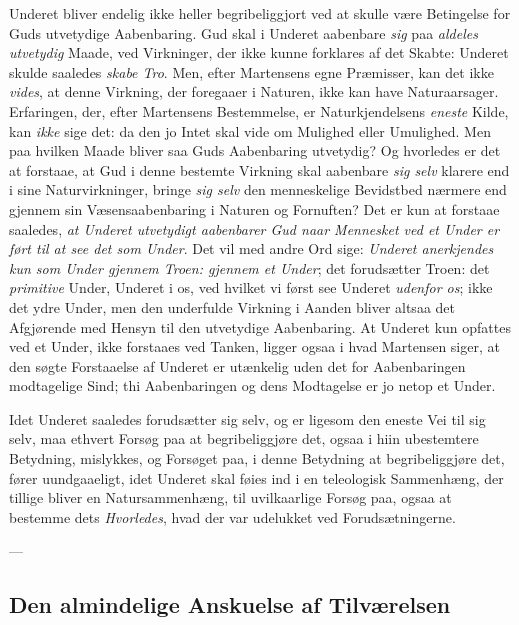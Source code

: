 \documentclass[12pt,a4paper]{book}
\newcommand{\opage}[1]{\marginnote{\footnotesize\textit{[#1]}}}
\begin{document}
Underet bliver endelig ikke heller begribeliggjort ved at skulle være Betingelse for Guds
utvetydige Aabenbaring. Gud skal i Underet aabenbare \emph{sig} paa \emph{aldeles utvetydig} Maade, ved
Virkninger, der ikke kunne forklares af det \opage{88}Skabte: Underet skulde saaledes \emph{skabe
Tro}. Men, efter Martensens egne Præmisser, kan det ikke \emph{vides}, at denne Virkning, der
foregaaer i Naturen, ikke kan have Naturaarsager. Erfaringen, der, efter Martensens
Bestemmelse, er Naturkjendelsens \emph{eneste} Kilde, kan \emph{ikke} sige det: da den jo Intet
skal vide om Mulighed eller Umulighed. Men paa hvilken Maade bliver saa Guds Aabenbaring
utvetydig? Og hvorledes er det at forstaae, at Gud i denne bestemte Virkning skal
aabenbare \emph{sig selv} klarere end i sine Naturvirkninger, bringe \emph{sig selv} den menneskelige Bevidstbed nærmere end gjennem sin Væsensaabenbaring i Naturen og Fornuften? Det er kun
at forstaae saaledes, \emph{at Underet utvetydigt aabenbarer Gud naar Mennesket ved et
Under er ført til at see det som Under}. Det vil med andre Ord sige: \emph{Underet anerkjendes kun som Under gjennem Troen: gjennem et Under}; det forudsætter Troen: det \emph{primitive} Under, Underet i os, ved hvilket vi først see Underet \emph{udenfor os}; ikke det
ydre Under, men den underfulde Virkning i Aanden bliver altsaa det Afgjørende med Hensyn
til den utvetydige Aabenbaring. At Underet kun opfattes ved et Under, ikke forstaaes ved
Tanken, ligger ogsaa i hvad Martensen siger, at den søgte Forstaaelse af Underet er
utænkelig uden det for Aabenbaringen modtagelige Sind; thi Aabenbaringen og dens
Modtagelse er jo netop et Under.

Idet Underet saaledes forudsætter sig selv, og er ligesom den eneste Vei til sig selv,
maa ethvert Forsøg paa at begribeliggjøre det, ogsaa i hiin ubestemtere Betydning,
mislykkes, og Forsøget paa, i denne Betydning at begribeliggjøre det, fører uundgaaeligt,
idet Underet skal føies ind i en teleologisk Sammenhæng, der tillige bliver en
Natursammenhæng, til uvilkaarlige Forsøg paa, ogsaa at bestemme dets \emph{Hvorledes}, hvad der
var udelukket ved Forudsætningerne.

\begin{center}---\end{center}

\subsection{Den almindelige Anskuelse af Tilværelsen}
\label{ssec:alm-anskuelse}
\end{document}
